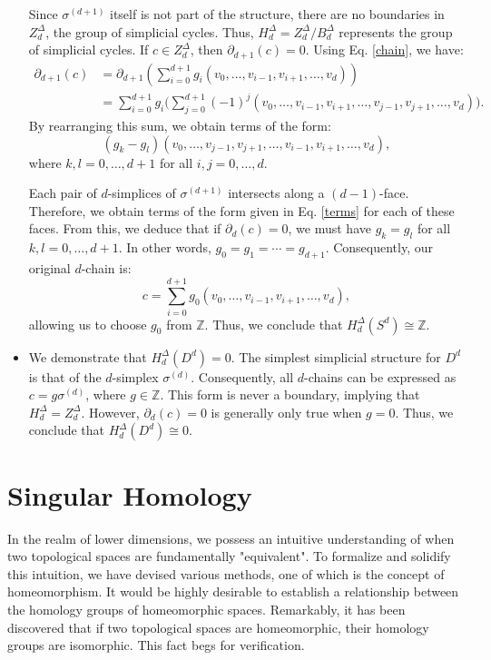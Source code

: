 \begin{example}
\begin{itemize}
			Since $\sigma^{(d+1)}$ itself is not part of the structure, there are no
			boundaries in $Z^{\Delta}_{d}$, the group of simplicial cycles. Thus, $H^{\Delta}
			_{d} = Z^{\Delta}_{d} / B^{\Delta}_{d}$ represents the group of simplicial
			cycles. If $c \in Z^{\Delta}_{d}$, then $\partial_{d+1}(c) = 0$. Using Eq.
			\ref{chain}, we have:
			\begin{align}
				\partial_{d+1}(c) & = \partial_{d+1}\left( \sum_{i=0}^{d+1}g_{i} (v_{0}, \ldots, v_{i-1}, v_{i+1}, \ldots, v_{d}) \right)                                    \\
				                  & = \sum_{i=0}^{d+1}g_{i} \big( \sum_{j=0}^{d+1}(-1)^{j} (v_{0}, \ldots, v_{i-1}, v_{i+1}, \ldots, v_{j-1}, v_{j+1}, \ldots, v_{d}) \big).
			\end{align}
			By rearranging this sum, we obtain terms of the form:
			\[
				\label{terms}(g_{k} - g_{l})(v_{0}, \ldots, v_{j-1}, v_{j+1}, \ldots, v_{i-1}
				, v_{i+1}, \ldots, v_{d}),
			\]
			where $k, l = 0, \ldots, d+1$ for all $i, j = 0, \ldots, d$.

			Each pair of $d$-simplices of $\sigma^{(d+1)}$ intersects along a $(d-1)$-face.
			Therefore, we obtain terms of the form given in Eq. \ref{terms} for each
			of these faces. From this, we deduce that if $\partial_{d}(c) = 0$, we must
			have $g_{k} = g_{l}$ for all $k, l = 0, \ldots, d+1$. In other words, $g_{0}
			= g_{1} = \cdots = g_{d+1}$. Consequently, our original $d$-chain is:
			\[
				c = \sum_{i=0}^{d+1}g_{0} (v_{0}, \ldots, v_{i-1}, v_{i+1}, \ldots, v_{d}
				),
			\]
			allowing us to choose $g_{0}$ from $\mathbb{Z}$. Thus, we conclude that
			$H^{\Delta}_{d}(S^{d}) \cong \mathbb{Z}$.

		\item We demonstrate that $H^{\Delta}_{d}(D^{d}) = 0$. The simplest
			simplicial structure for $D^{d}$ is that of the $d$-simplex $\sigma^{(d)}$.
			Consequently, all $d$-chains can be expressed as $c = g \sigma^{(d)}$, where
			$g \in \mathbb{Z}$. This form is never a boundary, implying that $H^{\Delta}
			_{d} = Z^{\Delta}_{d}$. However, $\partial_{d}(c) = 0$ is generally only true
			when $g = 0$. Thus, we conclude that $H^{\Delta}_{d}(D^{d}) \cong 0$.
	\end{itemize}
\end{example}

\section{Singular Homology}
\label{Singular Homology} In the realm of lower dimensions, we possess an
intuitive understanding of when two topological spaces are fundamentally "equivalent".
To formalize and solidify this intuition, we have devised various methods, one of
which is the concept of homeomorphism. It would be highly desirable to establish
a relationship between the homology groups of homeomorphic spaces. Remarkably,
it has been discovered that if two topological spaces are homeomorphic, their homology
groups are isomorphic. This fact begs for verification.

